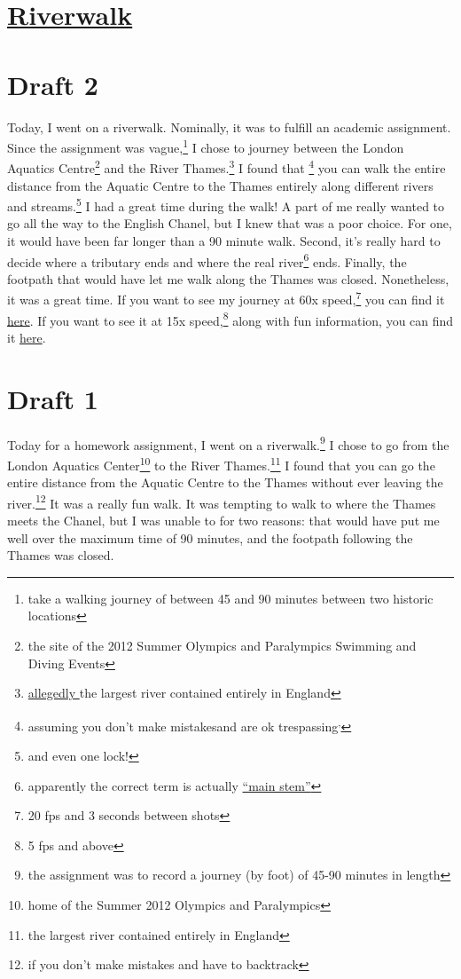 \documentclass[12pt]{article}[titlepage]
\newcommand{\say}[1]{``#1''}
\newcommand{\1}{\={a}}
\newcommand{\2}{\={e}}
\newcommand{\3}{\={\i}}
\newcommand{\4}{\=o}
\newcommand{\5}{\=u}
\newcommand{\6}{\={A}}
\renewcommand{\,}{\textsuperscript{,}}
\begin{document}
\doublespacing

\section{\href{riverwalk.html}{Riverwalk}}
\section{Draft 2}
Today, I went on a riverwalk.
Nominally, it was to fulfill an academic assignment.
Since the assignment was vague,\footnote{take a walking journey of between 45 and 90 minutes between two historic locations} I chose to journey between the London Aquatics Centre\footnote{the site of the 2012 Summer Olympics and Paralympics Swimming and Diving Events} and the River Thames.\footnote{\href{https://en.wikipedia.org/wiki/River_Thames}{allegedly }the largest river contained entirely in England}
I found that
\footnote{assuming you don't make mistakes\footnotemark and are ok trespassing\footnotemark\,\footnotemark}
you can walk the entire distance from the Aquatic Centre to the Thames entirely along different rivers and streams.\footnote{and even one lock!}
I had a great time during the walk!
A part of me really wanted to go all the way to the English Chanel, but I knew that was a poor choice.
For one, it would have been far longer than a 90 minute walk.
Second, it's really hard to decide where a tributary ends and where the real river\footnote{apparently the correct term is actually \href{https://en.wikipedia.org/wiki/Main_stem}{\say{main stem}}} ends.
Finally, the footpath that would have let me walk along the Thames was closed.
Nonetheless, it was a great time.
If you want to see my journey at 60x speed,\footnote{20 fps and 3 seconds between shots} you can find it \href{https://vimeo.com/288755224}{here}.
If you want to see it at 15x speed,\footnote{5 fps and above} along with fun information, you can find it \href{https://www.youtube.com/watch?v=z1j-zlVfoHo}{here}.

\section{Draft 1}
Today for a homework assignment, I went on a riverwalk.\footnote{the assignment was to record a journey (by foot) of 45-90 minutes in length}
I chose to go from the London Aquatics Center\footnote{home of the Summer 2012 Olympics and Paralympics} to the River Thames.\footnote{the largest river contained entirely in England}
I found that you can go the entire distance from the Aquatic Centre to the Thames without ever leaving the river.\footnote{if you don't make mistakes and have to backtrack\footnotemark}
It was a really fun walk.
It was tempting to walk to where the Thames meets the Chanel, but I was unable to for two reasons: that would have put me well over the maximum time of 90 minutes, and the footpath following the Thames was closed.
\end{document}
